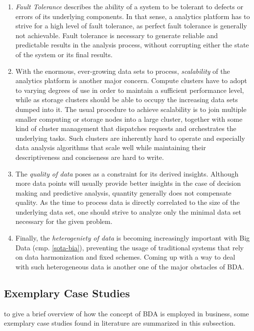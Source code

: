 \begin{enumerate}
    \item \emph{Fault Tolerance} describes the ability of a system to be tolerant to defects or errors of its underlying components. In that sense, a analytics platform has to strive for a high level of fault tolerance, as perfect fault tolerance is generally not achievable. Fault tolerance is necessary to generate reliable and predictable results in the analysis process, without corrupting either the state of the system or its final results.
    \item With the enormous, ever-growing data sets to process, \emph{scalability} of the analytics platform is another major concern. Compute clusters have to adopt to varying degrees of use in order to maintain a sufficient performance level, while as storage clusters should be able to occupy the increasing data sets dumped into it. The usual procedure to achieve scalability is to join multiple smaller computing or storage nodes into a large cluster, together with some kind of cluster management that dispatches requests and orchestrates the underlying tasks. Such clusters are inherently hard to operate and especially data analysis algorithms that scale well while maintaining their descriptiveness and conciseness are hard to write.
    \item The \emph{quality of data} poses as a constraint for its derived insights. Although more data points will usually provide better insights in the case of decision making and predictive analysis, quantity generally does not compensate quality. As the time to process data is directly correlated to the size of the underlying data set, one should strive to analyze only the minimal data set necessary for the given problem.
    \item Finally, the \emph{heterogeniety of data} is becoming increasingly important with Big Data (cmp. \autoref{sota-bia}), preventing the usage of traditional systems that rely on data harmonization and fixed schemes. Coming up with a way to deal with such heterogeneous data is another one of the major obstacles of \ac{BDA}.
\end{enumerate}

\subsection{Exemplary Case Studies}
\label{sota-bda-use-cases}

to give a brief overview of how the concept of \ac{BDA} is employed in business, some exemplary case studies found in literature are summarized in this subsection.

